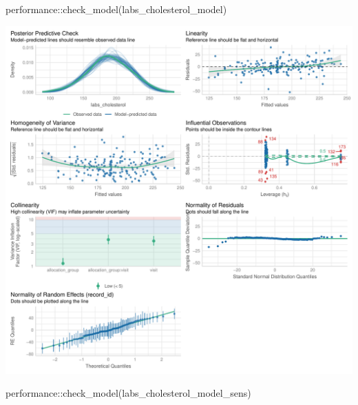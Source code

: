 \documentclass[
  12pt,
]{article}
\newenvironment{Shaded}{\begin{snugshade}}{\end{snugshade}}
\newcommand{\FunctionTok}[1]{\textcolor[rgb]{0.28,0.35,0.67}{#1}}
\newcommand{\NormalTok}[1]{\textcolor[rgb]{0.00,0.23,0.31}{#1}}
\newcommand{\SpecialCharTok}[1]{\textcolor[rgb]{0.37,0.37,0.37}{#1}}
\begin{document}
\begin{Shaded}
\begin{Highlighting}[]
\NormalTok{performance}\SpecialCharTok{::}\FunctionTok{check\_model}\NormalTok{(labs\_cholesterol\_model)}
\end{Highlighting}
\end{Shaded}

\includegraphics{Outcomes_files/figure-pdf/labs_cholesterol_4-1.pdf}

\begin{Shaded}
\begin{Highlighting}[]
\NormalTok{performance}\SpecialCharTok{::}\FunctionTok{check\_model}\NormalTok{(labs\_cholesterol\_model\_sens)}
\end{Highlighting}
\end{Shaded}
\end{document}

